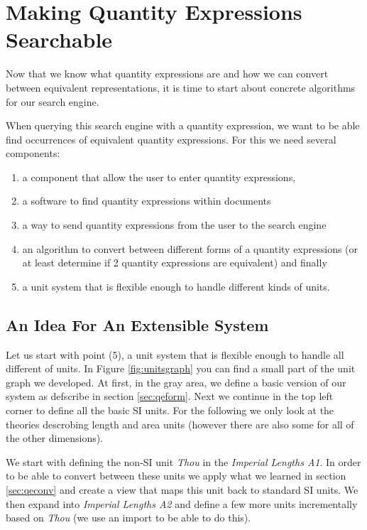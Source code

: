 \section{Making Quantity Expressions Searchable}
\label{sec:mqes}
Now that we know what quantity expressions are and how we can convert between equivalent representations, it is time to start about concrete algorithms for our search engine.

When querying this search engine with a quantity expression, we want to be able find occurrences of equivalent quantity expressions. For this we need several components:
\begin{enumerate}
  \item a component that allow the user to enter quantity expressions,
  \item a software to find quantity expressions within documents
  \item a way to send quantity expressions from the user to the search engine
  \item an algorithm to convert between different forms of a quantity expressions (or at least determine if 2 quantity expressions are equivalent) and finally
  \item a unit system that is flexible enough to handle different kinds of units.
\end{enumerate}

\subsection{An Idea For An Extensible System}
\label{sec:meq_model}

Let us start with point (5), a unit system that is flexible enough to handle all different of units. In Figure \ref{fig:unitsgraph} you can find a small part of the unit graph we developed. At first, in the gray area, we define a basic version of our system as defscribe in section \ref{sec:qeform}. Next we continue in the top left corner to define all the basic SI units. For the following we only look at the theories descrobing length and area units (however there are also some for all of the other dimensions).



We start with defining the non-SI unit \textit{Thou} in the \textit{Imperial Lengths A1}. In order to be able to convert between these units we apply what we learned in section \ref{sec:qeconv} and create a view that maps this unit back to standard SI units. We then expand into \textit{Imperial Lengths A2} and define a few more units incrementally based on \textit{Thou} (we use an import to be able to do this).

